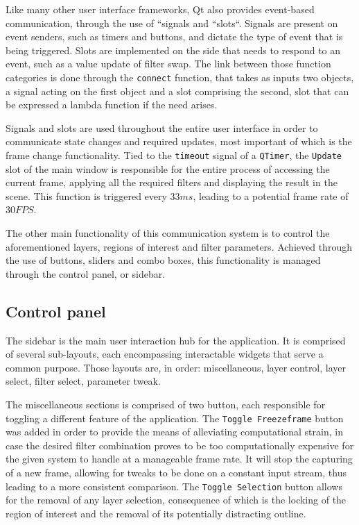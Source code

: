 Like many other user interface frameworks, Qt also provides event-based communication, through the use of
``signals and ``slots``. Signals are present on event senders, such as timers and buttons, and dictate the
type of event that is being triggered. Slots are implemented on the side that needs to respond to an event,
such as a value update of filter swap. The link between those function categories is done through the
\verb|connect| function, that takes as inputs two objects, a signal acting on the first object and a slot
comprising the second, slot that can be expressed a lambda function if the need arises. \cite{qtDoc}

Signals and slots are used throughout the entire user interface in order to communicate state changes and
required updates, most important of which is the frame change functionality. Tied to the \verb|timeout|
signal of a \verb|QTimer|, the \verb|Update| slot of the main window is responsible for the entire process
of accessing the current frame, applying all the required filters and displaying the result in the scene.
This function is triggered every \(33 ms\), leading to a potential frame rate of \(30 FPS\).

The other main functionality of this communication system is to control the aforementioned layers, regions
of interest and filter parameters. Achieved through the use of buttons, sliders and combo boxes, this
functionality is managed through the control panel, or sidebar.

\subsection{Control panel}

The sidebar is the main user interaction hub for the application. It is comprised of several sub-layouts,
each encompassing interactable widgets that serve a common purpose. Those layouts are, in order:
miscellaneous, layer control, layer select, filter select, parameter tweak.

The miscellaneous sections is comprised of two button, each responsible for toggling a different feature of
the application. The \verb|Toggle Freezeframe| button was added in order to provide the means of alleviating
computational strain, in case the desired filter combination proves to be too computationally expensive for
the given system to handle at a manageable frame rate. It will stop the capturing of a new frame, allowing for
tweaks to be done on a constant input stream, thus leading to a more consistent comparison. The
\verb|Toggle Selection| button allows for the removal of any layer selection, consequence of which is the
locking of the region of interest and the removal of its potentially distracting outline.

